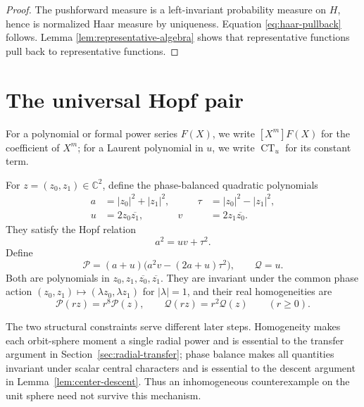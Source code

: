 \documentclass[11pt]{article}
\numberwithin{equation}{section}
\newcommand{\C}{\mathbb C}
\newcommand{\CT}{\operatorname{CT}}
\begin{document}
\begin{proof}
The pushforward measure is a left-invariant probability measure on $H$, hence
is normalized Haar measure by uniqueness.  Equation
\eqref{eq:haar-pullback} follows.  Lemma \ref{lem:representative-algebra}
shows that representative functions pull back to representative functions.
\end{proof}

\section{The universal Hopf pair}

For a polynomial or formal power series $F(X)$, we write $[X^m]F(X)$ for
the coefficient of $X^m$; for a Laurent polynomial in $u$, we write
$\CT_u$ for its constant term.

For $z=(z_0,z_1)\in\C^2$, define the phase-balanced quadratic polynomials
\begin{equation}\label{eq:hopf-coordinates}
 \begin{alignedat}{2}
 a&=|z_0|^2+|z_1|^2,
 &\qquad \tau&=|z_0|^2-|z_1|^2,\\
 u&=2z_0\overline{z_1},
 &v&=2z_1\overline{z_0}.
 \end{alignedat}
\end{equation}
They satisfy the Hopf relation
\begin{equation}\label{eq:hopf-relation}
 a^2=uv+\tau^2.
\end{equation}
Define
\begin{equation}\label{eq:universal-pair}
 \boxed{
 \mathscr P=(a+u)\bigl(a^2v-(2a+u)\tau^2\bigr),
 \qquad
 \mathscr Q=u.}
\end{equation}
Both are polynomials in $z_0,z_1,\overline{z_0},\overline{z_1}$.  They are
invariant under the common phase action
$(z_0,z_1)\mapsto(\lambda z_0,\lambda z_1)$ for $|\lambda|=1$, and their real
homogeneities are
\begin{equation}\label{eq:homogeneity}
 \mathscr P(rz)=r^8\mathscr P(z),
 \qquad
 \mathscr Q(rz)=r^2\mathscr Q(z)
 \qquad(r\geq0).
\end{equation}

The two structural constraints serve different later steps.  Homogeneity makes
each orbit-sphere moment a single radial power and is essential to the transfer
argument in Section~\ref{sec:radial-transfer}; phase balance makes all
quantities invariant under scalar central characters and is essential to the
descent argument in Lemma~\ref{lem:center-descent}.  Thus an inhomogeneous
counterexample on the unit sphere need not survive this mechanism.
\end{document}
